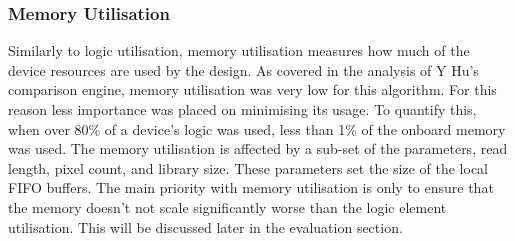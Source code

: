 \subsubsection{Memory Utilisation}
Similarly to logic utilisation, memory utilisation measures how much of the device resources are used by the design. As covered in the analysis of Y Hu's comparison engine, memory utilisation was very low for this algorithm. For this reason less importance was placed on minimising its usage. To quantify this, when over 80\% of a device's logic was used, less than 1\% of the onboard memory was used. The memory utilisation is affected by a sub-set of the parameters, read length, pixel count, and library size. These parameters set the size of the local FIFO buffers. The main priority with memory utilisation is only to ensure that the memory doesn't not scale significantly worse than the logic element utilisation. This will be discussed later in the evaluation section.


\vspace*{\fill}


